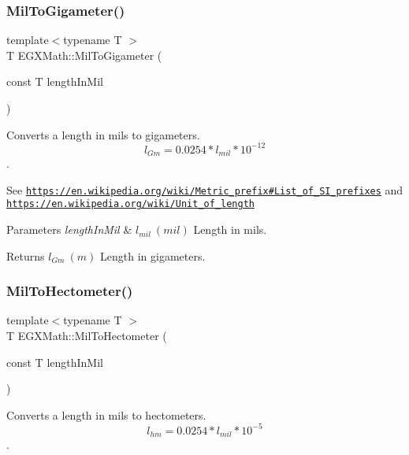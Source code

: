 \subsubsection{\texorpdfstring{Mil\+To\+Gigameter()}{MilToGigameter()}}
{\footnotesize\ttfamily template$<$typename T $>$ \\
T E\+G\+X\+Math\+::\+Mil\+To\+Gigameter (\begin{DoxyParamCaption}\item[{const T}]{length\+In\+Mil }\end{DoxyParamCaption})}



Converts a length in mils to gigameters. \[ l_{Gm}=0.0254* l_{mil} * 10^{-12} \]. 

See \href{https://en.wikipedia.org/wiki/Metric_prefix#List_of_SI_prefixes}{\tt https\+://en.\+wikipedia.\+org/wiki/\+Metric\+\_\+prefix\#\+List\+\_\+of\+\_\+\+S\+I\+\_\+prefixes} and \href{https://en.wikipedia.org/wiki/Unit_of_length}{\tt https\+://en.\+wikipedia.\+org/wiki/\+Unit\+\_\+of\+\_\+length} 
\begin{DoxyParams}{Parameters}
{\em length\+In\+Mil} & $ l_{mil}\ (mil)$ Length in mils. \\
\hline
\end{DoxyParams}
\begin{DoxyReturn}{Returns}
$ l_{Gm}\ (m)$ Length in gigameters. 
\end{DoxyReturn}
\mbox{\label{group___e_g_x_math-_conversions-_length_conversions-_imperial-_mil-_s_i_ga433a3360f7bf01c5c347b9d3ba3074a5}} 
\subsubsection{\texorpdfstring{Mil\+To\+Hectometer()}{MilToHectometer()}}
{\footnotesize\ttfamily template$<$typename T $>$ \\
T E\+G\+X\+Math\+::\+Mil\+To\+Hectometer (\begin{DoxyParamCaption}\item[{const T}]{length\+In\+Mil }\end{DoxyParamCaption})}



Converts a length in mils to hectometers. \[ l_{hm}=0.0254* l_{mil} * 10^{-5} \]. 

